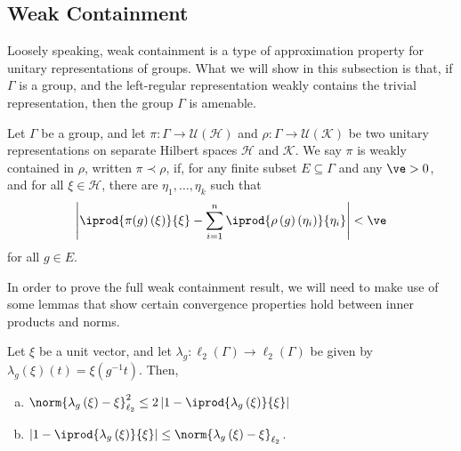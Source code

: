 \subsection{Weak Containment}%
Loosely speaking, weak containment is a type of approximation property for unitary representations of groups. What we will show in this subsection is that, if $\Gamma$ is a group, and the left-regular representation weakly contains the trivial representation, then the group $\Gamma$ is amenable.
\begin{definition}
  Let $\Gamma$ be a group, and let $\pi\colon \Gamma\rightarrow \mathcal{U}\left( \mathcal{H} \right)$ and $\rho\colon \Gamma\rightarrow \mathcal{U}\left( \mathcal{K} \right)$ be two unitary representations on separate Hilbert spaces $\mathcal{H}$ and $\mathcal{K}$. We say $\pi$ is weakly contained in $\rho$, written $\pi\prec \rho$, if, for any finite subset $E\subseteq \Gamma$ and any $\ve > 0$, and for all $\xi\in \mathcal{H}$, there are $\eta_1,\dots,\eta_k$ such that
  \begin{align*}
    \left\vert \iprod{\pi(g)\left( \xi \right)}{\xi} - \sum_{i=1}^{n} \iprod{\rho\left( g \right)\left( \eta_i \right)}{\eta_i} \right\vert < \ve
  \end{align*}
  for all $g \in E$.
\end{definition}
In order to prove the full weak containment result, we will need to make use of some lemmas that show certain convergence properties hold between inner products and norms.
\begin{lemma}\label{lemma:complex_identities_left_regular_representation}
  Let $\xi$ be a unit vector, and let $\lambda_g\colon \ell_2\left( \Gamma \right)\rightarrow \ell_2\left( \Gamma \right)$ be given by $\lambda_g\left( \xi \right)\left( t \right) = \xi\left( g^{-1}t \right)$. Then,
  \begin{enumerate}[(a)]
    \item $\displaystyle \norm{\lambda_g\left( \xi \right) - \xi}_{\ell_2}^2 \leq 2\left\vert 1- \iprod{\lambda_g\left( \xi \right)}{\xi} \right\vert$
    \item $\displaystyle \left\vert 1- \iprod{\lambda_g\left( \xi \right)}{\xi} \right\vert \leq \norm{\lambda_g\left( \xi \right) - \xi}_{\ell_2}$.
  \end{enumerate}
\end{lemma}

